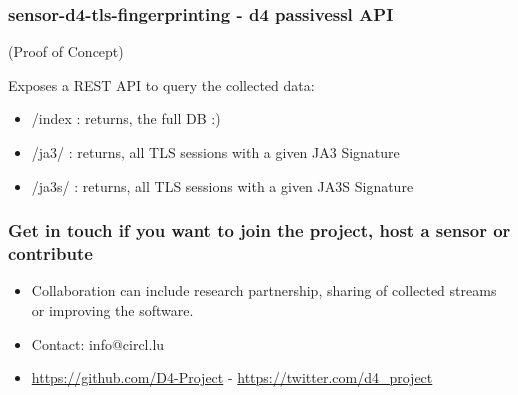 \documentclass{beamer}
\begin{document}
\begin{frame}[fragile]
        \frametitle{sensor-d4-tls-fingerprinting - d4 passivessl API} 
        (Proof of Concept)
        
        Exposes a REST API to query the collected data:
        \begin{itemize}
          \item /index : returns, the full DB :)
          \item /ja3/ : returns, all TLS sessions with a given JA3 Signature
          \item /ja3s/ : returns, all TLS sessions with a given JA3S Signature
        \end{itemize}
\end{frame}


\begin{frame}
\frametitle{Get in touch if you want to join the project, host a sensor or contribute}
\begin{itemize}
\item Collaboration can include research partnership, sharing of collected streams or improving the software.
\item Contact: info@circl.lu
\item \url{https://github.com/D4-Project} -  \url{https://twitter.com/d4_project}
\end{itemize}
\end{frame}
\end{document}

